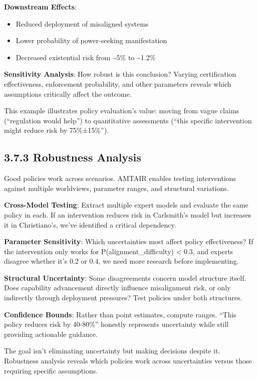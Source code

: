 \documentclass[
  11pt,
  letterpaper,
  openany]{book}
\providecommand{\tightlist}{%
  \setlength{\itemsep}{0pt}\setlength{\parskip}{0pt}}
\begin{document}
\textbf{Downstream Effects}:

\begin{itemize}
\tightlist
\item
  Reduced deployment of misaligned systems
\item
  Lower probability of power-seeking manifestation
\item
  Decreased existential risk from \textasciitilde5\% to
  \textasciitilde1.2\%
\end{itemize}

\textbf{Sensitivity Analysis}: How robust is this conclusion? Varying
certification effectiveness, enforcement probability, and other
parameters reveals which assumptions critically affect the outcome.

This example illustrates policy evaluation's value: moving from vague
claims (``regulation would help'') to quantitative assessments (``this
specific intervention might reduce risk by 75\%±15\%'').

\subsection{3.7.3 Robustness Analysis}\label{sec-robustness}

Good policies work across scenarios. AMTAIR enables testing
interventions against multiple worldviews, parameter ranges, and
structural variations.

\textbf{Cross-Model Testing}: Extract multiple expert models and
evaluate the same policy in each. If an intervention reduces risk in
Carlsmith's model but increases it in Christiano's, we've identified a
critical dependency.

\textbf{Parameter Sensitivity}: Which uncertainties most affect policy
effectiveness? If the intervention only works for
P(alignment\_difficulty) \textless{} 0.3, and experts disagree whether
it's 0.2 or 0.4, we need more research before implementing.

\textbf{Structural Uncertainty}: Some disagreements concern model
structure itself. Does capability advancement directly influence
misalignment risk, or only indirectly through deployment pressures? Test
policies under both structures.

\textbf{Confidence Bounds}: Rather than point estimates, compute ranges.
``This policy reduces risk by 40-80\%'' honestly represents uncertainty
while still providing actionable guidance.

The goal isn't eliminating uncertainty but making decisions despite it.
Robustness analysis reveals which policies work across uncertainties
versus those requiring specific assumptions.
\end{document}
